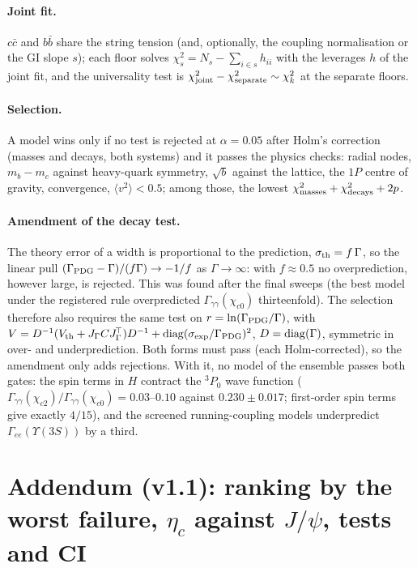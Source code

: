 \documentclass[11pt,a4paper]{article}
\numberwithin{equation}{section}
\theoremstyle{definition}
\theoremstyle{plain}
\theoremstyle{remark}
\numberwithin{algorithm}{section}
\begin{document}
\paragraph{Joint fit.} $c\bar c$ and $b\bar b$ share the string tension (and, optionally,
the coupling normalisation or the GI slope $s$); each floor solves
$\chi^2_s=N_s-\sum_{i\in s}h_{ii}$ with the leverages $h$ of the joint fit, and the
universality test is $\chi^2_{\rm joint}-\chi^2_{\rm separate}\sim\chi^2_k$ at the separate
floors.

\paragraph{Selection.} A model wins only if no test is rejected at $\alpha=0.05$ after Holm's
correction (masses and decays, both systems) and it passes the physics checks: radial
nodes, $m_b-m_c$ against heavy-quark symmetry, $\sqrt b$ against the lattice, the $1P$
centre of gravity, convergence, $\langle v^2\rangle<0.5$; among those, the lowest
$\chi^2_{\rm masses}+\chi^2_{\rm decays}+2p$.

\paragraph{Amendment of the decay test.} The theory error of a width is proportional to the
prediction, $\sigma_{\rm th}=f\,\Gamma$, so the linear pull
$(\Gamma_{\rm PDG}-\Gamma)/(f\Gamma)\to-1/f$ as $\Gamma\to\infty$: with $f\approx0.5$ no
overprediction, however large, is rejected. This was found after the final sweeps (the best
model under the registered rule overpredicted $\Gamma_{\gamma\gamma}(\chi_{c0})$ thirteenfold).
The selection therefore also requires the same test on $r=\ln(\Gamma_{\rm PDG}/\Gamma)$, with
$V=D^{-1}(V_{\rm th}+J_\Gamma CJ_\Gamma^{\!\top})D^{-1}+{\rm diag}(\sigma_{\rm exp}/\Gamma_{\rm
PDG})^2$, $D={\rm diag}(\Gamma)$, symmetric in over- and underprediction. Both forms must pass
(each Holm-corrected), so the amendment only adds rejections. With it, no model of the
ensemble passes both gates: the spin terms in $H$ contract the $^3P_0$ wave function
($\Gamma_{\gamma\gamma}(\chi_{c2})/\Gamma_{\gamma\gamma}(\chi_{c0})=0.03$--$0.10$ against
$0.230\pm0.017$; first-order spin terms give exactly $4/15$), and the screened
running-coupling models underpredict $\Gamma_{ee}(\Upsilon(3S))$ by a third.


\section{Addendum (v1.1): ranking by the worst failure, $\eta_c$ against $J/\psi$, tests and CI}\label{app:v11}
\end{document}
